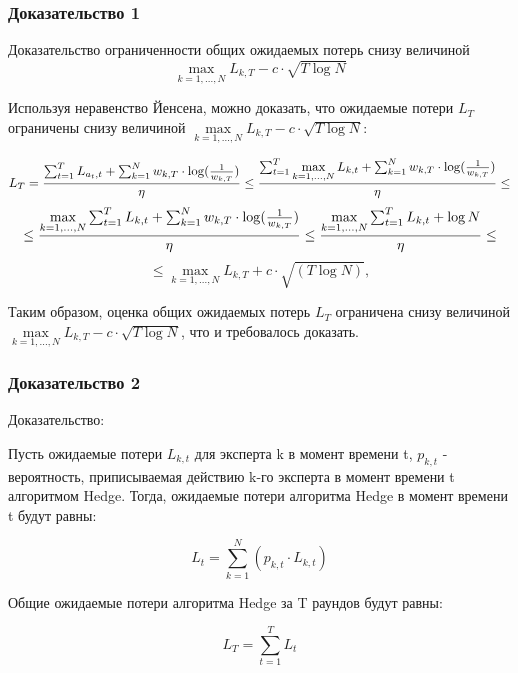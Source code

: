 \documentclass[a4paper,14pt]{extarticle}
\begin{document}
\subsubsection{Доказательство 1}

Доказательство ограниченности общих ожидаемых потерь снизу величиной
\begin{equation}\max\limits_{k=1,...,N} L_{k,T}-c\cdot\sqrt{T\log N}\end{equation}


Используя неравенство Йенсена, можно доказать, что ожидаемые потери $L_T$ ограничены снизу
величиной $\max\limits_{k=1,...,N} L_{k,T}-c\cdot\sqrt{T\log N}$:

$$L_T = \frac{\sum_{t=1}^T L_{a_t,t} + \sum_{k=1}^N w_{k,T} \cdot \log(\frac{1}{w_{k,T}})}{\eta}
\newline
\leq \frac{\sum_{t=1}^T \max\limits_{k=1,...,N} L_{k,t} + \sum_{k=1}^N w_{k,T} \cdot \log(\frac{1}{w_{k,T}})}{\eta}\leq$$
\newline
$$\leq \frac{\max\limits_{k=1,...,N} \sum_{t=1}^T L_{k,t} + \sum_{k=1}^N w_{k,T} \cdot \log(\frac{1}{w_{k,T}})}{\eta}
\newline
\leq \frac{\max\limits_{k=1,...,N} \sum_{t=1}^T L_{k,t} + \log N}{\eta}\leq$$
\newline
$$\leq \max\limits_{k=1,...,N} L_{k,T} + c \cdot \sqrt{(T \log N)},$$
\newline

Таким образом, оценка общих ожидаемых потерь $L_T$ ограничена снизу величиной $\max\limits_{k=1,...,N} L_{k,T}-c\cdot\sqrt{T\log N}$, что и требовалось доказать.

\subsubsection{Доказательство 2}

Доказательство:

Пусть ожидаемые потери $L_{k,t}$ для эксперта k в момент времени t, $p_{k,t}$ - вероятность, приписываемая действию k-го эксперта в момент времени t алгоритмом Hedge.
Тогда, ожидаемые потери алгоритма Hedge в момент времени t будут равны:

\begin{equation}L_t = \sum_{k=1}^N(p_{k,t} \cdot L_{k,t})\end{equation}

Общие ожидаемые потери алгоритма Hedge за T раундов будут равны:

\begin{equation}L_T = \sum_{t=1}^T{L_t}\end{equation}
\end{document}
